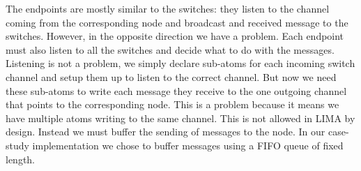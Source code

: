The endpoints are mostly similar to the switches: they listen to the channel
coming from the corresponding node and broadcast and received message to the
switches. However, in the opposite direction we have a problem. Each endpoint
must also listen to all the switches and decide what to do with the messages.
Listening is not a problem, we simply declare sub-atoms for each incoming
switch channel and setup them up to listen to the correct channel. But now we
need these sub-atoms to write each message they receive to the one outgoing
channel that points to the corresponding node. This is a problem because it
means we have multiple atoms writing to the same channel. This is not allowed
in LIMA by design. Instead we must buffer the sending of messages to the node.
In our case-study implementation we chose to buffer messages using a FIFO
queue of fixed length.

